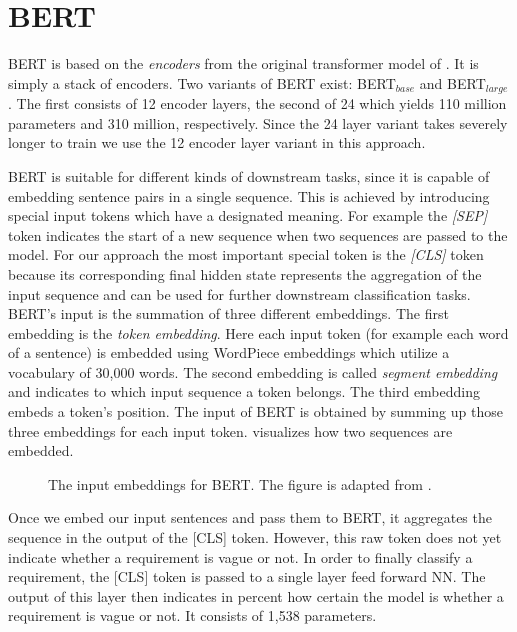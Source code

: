 \section{BERT}
\label{chp:approach:sec:BERT}

\Ac{BERT} is based on the \textit{encoders} from the original transformer model of \textcite{Vaswani:2017}.
It is simply a stack of encoders.
Two variants of \ac{BERT} exist: \ac{BERT}$_{base}$ and \ac{BERT}$_{large}$.
The first consists of 12 encoder layers, the second of 24 which yields 110 million parameters and 310 million, respectively.
Since the 24 layer variant takes severely longer to train we use the 12 encoder layer variant in this approach. \parencite{Devlin:2018}

\Ac{BERT} is suitable for different kinds of downstream tasks, since it is capable of embedding sentence pairs in a single sequence.
This is achieved by introducing special input tokens which have a designated meaning.
For example the \textit{[SEP]} token indicates the start of a new sequence when two sequences are passed to the model.
For our approach the most important special token is the \textit{[CLS]} token because its corresponding final hidden state represents the aggregation of the input sequence and can be used for further downstream classification tasks.
\Ac{BERT}'s input is the summation of three different embeddings.
The first embedding is the \textit{token embedding}.
Here each input token (for example each word of a sentence) is embedded using WordPiece embeddings \parencite{Wu:2016} which utilize a vocabulary of 30,000 words.
The second embedding is called \textit{segment embedding} and indicates to which input sequence a token belongs.
The third embedding embeds a token's position.
The input of \ac{BERT} is obtained by summing up those three embeddings for each input token.
 visualizes how two sequences are embedded. \parencite{Devlin:2018}
\begin{figure}[htpb]
    \centering
    \def\svgwidth{\columnwidth}
    \scalebox{1.07}{}
    \caption[BERT Input Embeddings]{The input embeddings for \ac{BERT}. The figure is adapted from \textcite{Devlin:2018}.}\label{fig:approach:BERT:input_embedding}
\end{figure}

Once we embed our input sentences and pass them to \ac{BERT}, it aggregates the sequence in the output of the [CLS] token.
However, this raw token does not yet indicate whether a requirement is vague or not.
In order to finally classify a requirement, the [CLS] token is passed to a single layer feed forward \ac{NN}.
The output of this layer then indicates in percent how certain the model is whether a requirement is vague or not.
It consists of 1,538 parameters.
